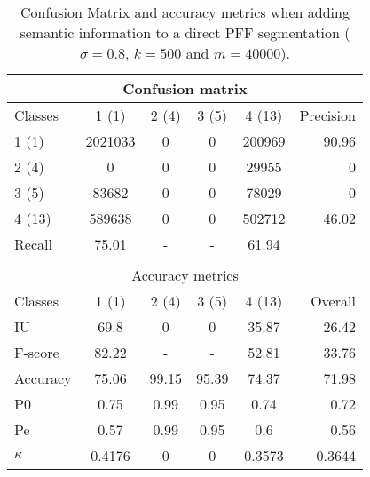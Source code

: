 \begin{table}[H]
\begin{center}
\footnotesize
\begin{tabular}{|l|c|c|c|c|r|}
\hline
\multicolumn{6}{|c|}{Confusion matrix} \\
\hline
 Classes & 1 (1) & 2 (4) & 3 (5) & 4 (13) & Precision \\
\hline
1 (1) & 2021033 & 0 & 0 & 200969 & 90.96 \\
\hline
2 (4) & 0 & 0 & 0 & 29955 & 0 \\
\hline
3 (5) & 83682 & 0 & 0 & 78029 & 0 \\
\hline
4 (13) & 589638 & 0 & 0 & 502712 & 46.02 \\
\hline
Recall & 75.01 & - & - & 61.94 &  \\
\hline
\multicolumn{6}{c}{ } \\
\hline
\multicolumn{6}{|c|}{Accuracy metrics} \\
\hline
 Classes & 1 (1) & 2 (4) & 3 (5) & 4 (13) & Overall \\
\hline
IU & 69.8 & 0 & 0 & 35.87 & 26.42 \\
\hline
F-score & 82.22 & - & - & 52.81 & 33.76 \\
\hline
Accuracy & 75.06 & 99.15 & 95.39 & 74.37 & 71.98 \\
\hline
P0 & 0.75 & 0.99 & 0.95 & 0.74 & 0.72 \\
\hline
Pe & 0.57 & 0.99 & 0.95 & 0.6 & 0.56 \\
\hline
$\kappa$ & 0.4176 & 0 & 0 & 0.3573 & 0.3644 \\
\hline
\end{tabular}
\caption{Confusion Matrix and accuracy metrics when adding semantic information to a direct PFF segmentation ($\sigma=0.8$, $k=500$ and $m=40000$).}
\label{table:C3_S2_seg_PFF}
\end{center}
\end{table}